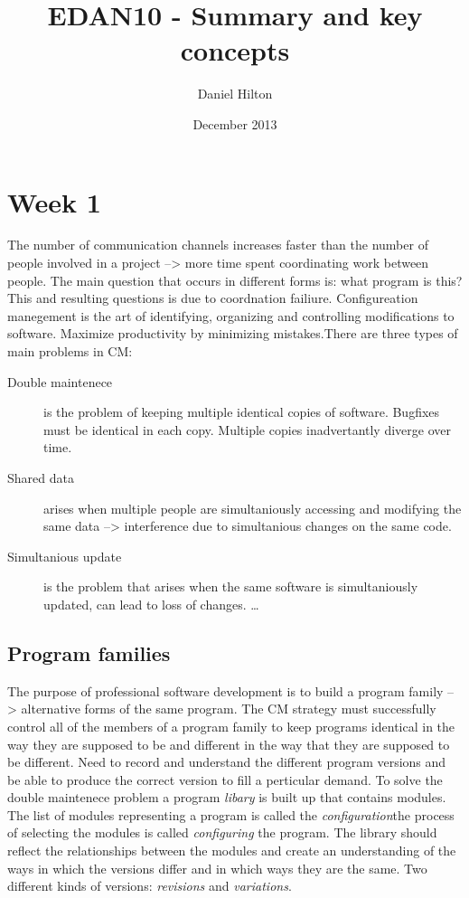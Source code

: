 \documentclass{article}
\title{EDAN10 - Summary and key concepts}
\author{Daniel Hilton}
\date{December 2013}
\begin{document}
\maketitle

\section{Week 1}
The number of communication channels increases faster than the number of people involved in a project -->  more time spent coordinating work between people.
The main question that occurs in different forms is: what program is this? This and resulting questions is due to coordnation failiure. Configureation manegement is the art of identifying, organizing and controlling modifications to software. Maximize productivity by minimizing mistakes.There are three types of main problems in CM: \\

    \begin{description}
    \item[Double maintenece]
    is the problem of keeping multiple identical copies of software. Bugfixes must be identical in each copy. Multiple copies inadvertantly diverge over time.
    \item[Shared data]
    arises when multiple people are simultaniously accessing and modifying the same data --> interference due to simultanious changes on the same code.
    \item[Simultanious update] is the problem that arises when the same software is simultaniously updated, can lead to loss of changes. \ldots
    \end{description}

    \subsection{Program families}
    The purpose of professional software development is to build a program family --> alternative forms of the same program. The CM  strategy must successfully control all of the members of a program family to keep programs identical in the way they are supposed to be and different in the way that they are supposed to be different. Need to record and understand the different program versions and be able to produce the correct version to fill a perticular demand. To solve the double maintenece problem a program \textit{libary} is built up that contains modules. The list of modules representing a program is called the \textit{configuration}the process of selecting the modules is called \textit{configuring} the program.
    The library should reflect the relationships between the modules and create an understanding of the ways in which the versions differ and in which ways they are the same. Two different kinds of versions: \textit{revisions} and \textit{variations}.
\end{document}
